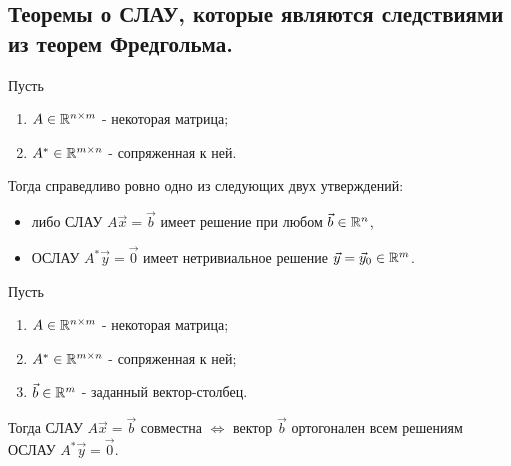 \newpage


\subsection{
    Теоремы о СЛАУ, которые являются следствиями из теорем Фредгольма.
}

\begin{theorem} Пусть 
    \begin{enumerate}
        \item $A \in \mathbb{R}^{n \times m}$ - некоторая матрица;
        \item $A^* \in \mathbb{R}^{m \times n}$ - сопряженная к ней.
    \end{enumerate}

    Тогда справедливо ровно одно из следующих двух утверждений:

    \begin{itemize}
        \item либо СЛАУ $A\vec{x} = \vec{b}$ имеет решение при любом $\vec{b} \in \mathbb{R}^n$, 
        \item ОСЛАУ $A^*\vec{y} = \vec{0}$ имеет нетривиальное решение $\vec{y} = \vec{y}_0 \in \mathbb{R}^m$.
    \end{itemize}
\end{theorem}

\begin{theorem} Пусть
    \begin{enumerate}
        \item $A \in \mathbb{R}^{n \times m}$ - некоторая матрица;
        \item $A^* \in \mathbb{R}^{m \times n}$ - сопряженная к ней;
        \item $\vec{b} \in \mathbb{R}^{m}$ - заданный вектор-столбец.
    \end{enumerate}

    Тогда СЛАУ $A\vec{x} = \vec{b}$ совместна $\iff$ вектор $\vec{b}$ ортогонален всем решениям ОСЛАУ $A^*\vec{y} = \vec{0}$.
\end{theorem}